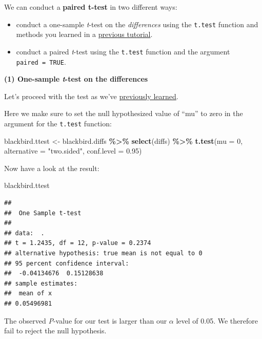 \documentclass[
]{book}
\newenvironment{Shaded}{\begin{snugshade}}{\end{snugshade}}
\newcommand{\AttributeTok}[1]{\textcolor[rgb]{0.13,0.29,0.53}{#1}}
\newcommand{\DecValTok}[1]{\textcolor[rgb]{0.00,0.00,0.81}{#1}}
\newcommand{\FloatTok}[1]{\textcolor[rgb]{0.00,0.00,0.81}{#1}}
\newcommand{\FunctionTok}[1]{\textcolor[rgb]{0.13,0.29,0.53}{\textbf{#1}}}
\newcommand{\NormalTok}[1]{#1}
\newcommand{\OtherTok}[1]{\textcolor[rgb]{0.56,0.35,0.01}{#1}}
\newcommand{\SpecialCharTok}[1]{\textcolor[rgb]{0.81,0.36,0.00}{\textbf{#1}}}
\newcommand{\StringTok}[1]{\textcolor[rgb]{0.31,0.60,0.02}{#1}}
\begin{document}
We can conduct a \textbf{paired t-test} in two different ways:

\begin{itemize}
\item
  conduct a one-sample \emph{t}-test on the \emph{differences} using the \texttt{t.test} function and methods you learned in a \hyperref[onesamp_t_test]{previous tutorial}.
\item
  conduct a paired \emph{t}-test using the \texttt{t.test} function and the argument \texttt{paired\ =\ TRUE}.
\end{itemize}

\textbf{(1) One-sample \emph{t}-test on the differences}

Let's proceed with the test as we've \hyperref[onesamp_t_test]{previously learned}.

Here we make sure to set the null hypothesized value of ``mu'' to zero in the argument for the \texttt{t.test} function:

\begin{Shaded}
\begin{Highlighting}[]
\NormalTok{blackbird.ttest }\OtherTok{\textless{}{-}}\NormalTok{ blackbird.diffs }\SpecialCharTok{\%\textgreater{}\%}
  \FunctionTok{select}\NormalTok{(diffs) }\SpecialCharTok{\%\textgreater{}\%}
  \FunctionTok{t.test}\NormalTok{(}\AttributeTok{mu =} \DecValTok{0}\NormalTok{, }\AttributeTok{alternative =} \StringTok{"two.sided"}\NormalTok{, }\AttributeTok{conf.level =} \FloatTok{0.95}\NormalTok{) }
\end{Highlighting}
\end{Shaded}

Now have a look at the result:

\begin{Shaded}
\begin{Highlighting}[]
\NormalTok{blackbird.ttest}
\end{Highlighting}
\end{Shaded}

\begin{verbatim}
## 
##  One Sample t-test
## 
## data:  .
## t = 1.2435, df = 12, p-value = 0.2374
## alternative hypothesis: true mean is not equal to 0
## 95 percent confidence interval:
##  -0.04134676  0.15128638
## sample estimates:
##  mean of x 
## 0.05496981
\end{verbatim}

The observed \emph{P}-value for our test is larger than our \(\alpha\) level of 0.05. We therefore fail to reject the null hypothesis.
\end{document}
